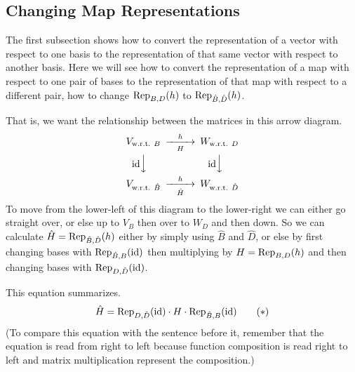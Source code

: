 \subsection{Changing Map Representations}
The first subsection shows how to convert the representation
of a vector with respect to one basis to the representation of that
same vector with respect to another basis.
Here we will see how to
convert the representation of a map  with
respect to one pair of bases  to the representation of that
map with respect to a different pair, how to change
$\rep{h}{B,D}$ to $\rep{h}{\hat{B},\hat{D}}$.

That is, we want the relationship between the matrices in this 
arrow diagram.
\begin{equation*}
  \begin{CD}
    V_\wrt{B}                   @>h>H>        W_\wrt{D}       \\
    @V\scriptstyle\identity VV                @V\scriptstyle\identity VV \\
    V_\wrt{\hat{B}}             @>h>\hat{H}>  W_\wrt{\hat{D}}
  \end{CD}
\end{equation*}
To move from the lower-left of this diagram 
to the lower-right we can either go straight over, or
else up to $V_B$ then over to $W_D$ and then down.
So 
we can calculate $\hat{H}=\rep{h}{\hat{B},\hat{D}}$ 
either by simply using $\hat{B}$ and $\hat{D}$,
or else by first changing bases with $\rep{\identity}{\hat{B},B}$ 
then multiplying by \( H=\rep{h}{B,D} \)
and then changing bases with $\rep{\identity}{D,\hat{D}}$.

This equation summarizes.
\begin{equation*}
   \hat{H}=
   \rep{\identity}{D,\hat{D}}\cdot H\cdot \rep{\identity}{\hat{B},B}
\tag*{\text{($*$})}\end{equation*}
(To compare this equation with the sentence before it, remember that the
equation is read from right to left because 
function composition is read right to left and matrix multiplication 
represent the composition.)

